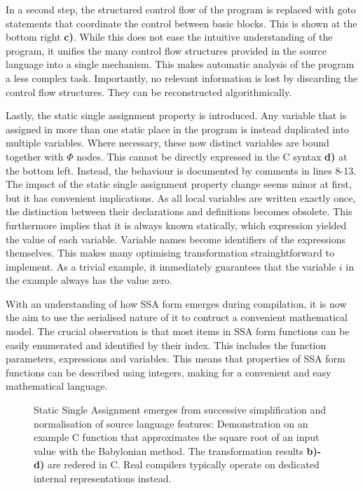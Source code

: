     In a second step, the structured control flow of the program is replaced
    with goto statements that coordinate the control between basic blocks.
    This is shown at the bottom right {\bf c)}.
    While this does not ease the intuitive understanding of the program, it
    unifies the many control flow structures provided in the source language
    into a single mechanism.
    This makes automatic analysis of the program a less complex task.
    Importantly, no relevant information is lost by discarding the control flow
    structures.
    They can be reconstructed algorithmically.

    Lastly, the static single assignment property is introduced.
    Any variable that is assigned in more than one static place in the program
    is instead duplicated into multiple variables.
    Where necessary, these now distinct variables are bound together with
    $\Phi$ nodes.
    This cannot be directly expressed in the C syntax {\bf d)} at the bottom
    left.
    Instead, the behaviour is documented by comments in lines 8-13.
    The impact of the static single assignment property change seems minor
    at first, but it has convenient implications.
    As all local variables are written exactly once, the distinction between
    their declarations and definitions becomes obsolete.
    This furthermore implies that it is always known statically, which
    expression yielded the value of each variable.
    Variable names become identifiers of the expressions themselves.
    This makes many optimising transformation strainghtforward to implement.
    As a trivial example, it immediately guarantees that the variable $i$ in the
    example always has the value zero.

    With an understanding of how SSA form emerges during compilation, it is now
    the aim to use the serialised nature of it to contruct a convenient
    mathematical model.
    The crucial observation is that most items in SSA form functions can be
    easily enumerated and identified by their index.
    This includes the function parameters, expressions and variables.
    This means that properties of SSA form functions can be described using
    integers, making for a convenient and easy mathematical language.

\begin{figure}[p]
    
    \caption{Static Single Assignment emerges from successive simplification
             and normalisation of source language features: 
             Demonstration on an example C function that approximates the
             square root of an input value with the Babylonian method.
             The transformation results {\bf b)-d)} are redered in C.
             Real compilers typically operate on
             dedicated internal representations instead.}
    \label{ssaexample}
\end{figure}

